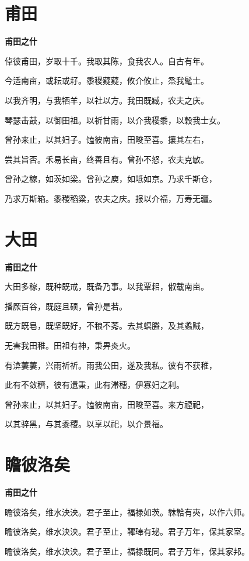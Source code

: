 \documentclass[12pt,a4paper]{ctexbook}
\begin{document}
\section{甫田}
\textbf{甫田之什}\par\vspace{0.5em}
倬彼甫田，岁取十千。我取其陈，食我农人。自古有年。\par
今适南亩，或耘或耔。黍稷薿薿，攸介攸止，烝我髦士。\par
以我齐明，与我牺羊，以社以方。我田既臧，农夫之庆。\par
琴瑟击鼓，以御田祖。以祈甘雨，以介我稷黍，以穀我士女。\par
曾孙来止，以其妇子。馌彼南亩，田畯至喜。攘其左右，\par
尝其旨否。禾易长亩，终善且有。曾孙不怒，农夫克敏。\par
曾孙之稼，如茨如梁。曾孙之庾，如坻如京。乃求千斯仓，\par
乃求万斯箱。黍稷稻粱，农夫之庆。报以介福，万寿无疆。\par

\section{大田}
\textbf{甫田之什}\par\vspace{0.5em}
大田多稼，既种既戒，既备乃事。以我覃耜，俶载南亩。\par
播厥百谷，既庭且硕，曾孙是若。\par
既方既皂，既坚既好，不稂不莠。去其螟螣，及其蟊贼，\par
无害我田稚。田祖有神，秉畀炎火。\par
有渰萋萋，兴雨祈祈。雨我公田，遂及我私。彼有不获稚，\par
此有不敛穧，彼有遗秉，此有滞穗，伊寡妇之利。\par
曾孙来止，以其妇子。馌彼南亩，田畯至喜。来方禋祀，\par
以其骍黑，与其黍稷。以享以祀，以介景福。\par

\section{瞻彼洛矣}
\textbf{甫田之什}\par\vspace{0.5em}
瞻彼洛矣，维水泱泱。君子至止，福禄如茨。韎韐有奭，以作六师。\par
瞻彼洛矣，维水泱泱。君子至止，鞸琫有珌。君子万年，保其家室。\par
瞻彼洛矣，维水泱泱。君子至止，福禄既同。君子万年，保其家邦。\par
\end{document}
